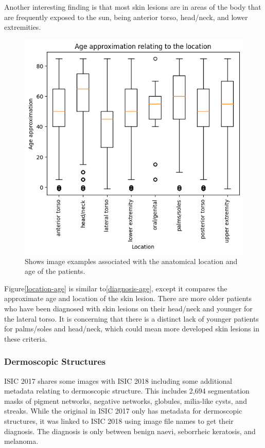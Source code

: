 Another interesting finding is that most skin lesions are in areas of the body that are frequently exposed to the sun, being anterior torso, head/neck, and lower extremities.

\begin{figure}
    \centering
    \includegraphics[scale=0.75]{images/ISIC/location-age.png}
    \caption{Shows image examples associated with the anatomical location and age of the patients.} 
\end{figure}\label{location-age}

Figure\ref{location-age} is similar to\ref{diagnosis-age}, except it compares the approximate age and location of the skin lesion. There are more older patients who have been diagnosed with skin lesions on their head/neck and younger for the lateral torso. It is concerning that there is a distinct lack of younger patients for palms/soles and head/neck, which could mean more developed skin lesions in these criteria.

\subsubsection{Dermoscopic Structures}
ISIC 2017 shares some images with ISIC 2018 including some additional metadata relating to dermoscopic structure. This includes 2,694 segmentation masks of pigment networks, negative networks, globules, milia-like cysts, and streaks. While the original in ISIC 2017 only has metadata for dermoscopic structures, it was linked to ISIC 2018 using image file names to get their diagnosis. The diagnosis is only between benign naevi, seborrheic keratosis, and melanoma. 


